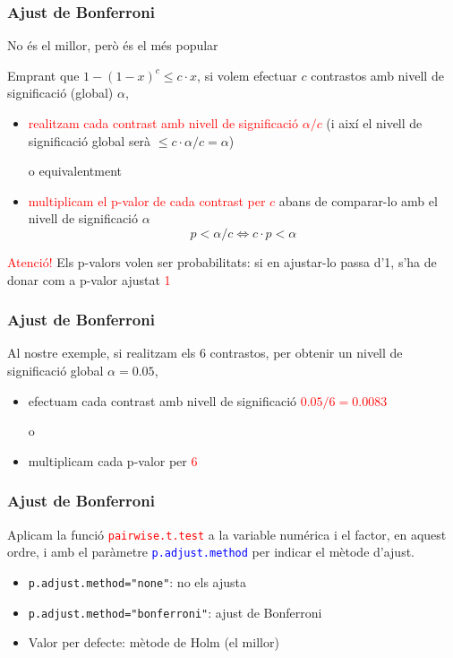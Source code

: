 \documentclass[12pt,t]{beamer}
\newcommand{\red}[1]{\textcolor{red}{#1}}
\newcommand{\blue}[1]{\textcolor{blue}{#1}}
\renewcommand{\leq}{\leqslant}
\theoremstyle{plain}
\theoremstyle{definition}
\begin{document}
\begin{frame}
\frametitle{Ajust de Bonferroni} 

No és el millor, però és el més popular\medskip

Emprant que $1-(1-x)^c \leq c\cdot x$, si volem efectuar $c$ contrastos amb nivell de significació (global) $\alpha$, 
\begin{itemize}
\item \red{realitzam cada contrast amb nivell de significació $\alpha/c$} (i així el nivell de significació 
global serà $\leq c\cdot \alpha/c=\alpha$)\medskip

o equivalentment\medskip

\item \red{multiplicam el p-valor de cada contrast per $c$}
abans de comparar-lo amb el nivell de significació $\alpha$
$$
p<\alpha/c \Longleftrightarrow c\cdot p<\alpha
$$
\end{itemize}\pause\medskip

\red{Atenció!} Els p-valors volen ser probabilitats: si en ajustar-lo  passa d'1, s'ha de donar com a p-valor ajustat \red{1}
\end{frame}


\begin{frame}
\frametitle{Ajust de Bonferroni} 

Al nostre exemple, si realitzam els  6 contrastos, per obtenir un nivell de significació global  $\alpha =0.05$,\medskip

\begin{itemize}
\item  efectuam cada contrast amb nivell de significació
\red{$0.05/6=0.0083$} \medskip

o \medskip

\item multiplicam cada p-valor per \red{6}
\end{itemize}

\end{frame}



\begin{frame}[fragile]
\frametitle{Ajust de Bonferroni} 

Aplicam la funció \red{\texttt{pairwise.t.test}} a la variable numérica i el factor, en aquest ordre, i amb el paràmetre \blue{\texttt{p.adjust.method}} per indicar el mètode d'ajust.\medskip

\begin{itemize}
\item \texttt{p.adjust.method="none"}: no els ajusta
\item \texttt{p.adjust.method="bonferroni"}: ajust de Bonferroni
\item Valor per defecte: mètode de Holm (el millor)
\end{itemize}

\end{frame}
\end{document}
